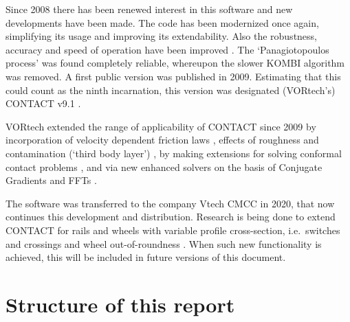\documentclass[12pt]{report}
\begin{document}
Since 2008 there has been renewed interest in this software and new
developments have been made. The code has been modernized once again,
simplifying its usage and improving its extendability. Also the robustness,
accuracy and speed of operation have been improved
\cite{Vollebregt2009a-cm2009}. The `Panagiotopoulos process' was found
completely reliable, whereupon the slower KOMBI algorithm was removed. A
first public version was published in 2009. Estimating that this could count
as the ninth incarnation, this version was designated (VORtech's) CONTACT
v9.1 \cite{Vollebregt2009b-userguide-v9}.

VORtech extended the range of applicability of CONTACT since 2009 by
incorporation of velocity dependent friction laws
\cite{Vollebregt2014c-tractcurv,Vollebregt2012a-quasistd}, effects of
roughness and contamination (`third body layer') 
\cite{Vollebregt2014c-tractcurv,Vollebregt2026a-tractcurv,
Vollebregt2021a-soa-paper,Vollebregt2024a-vor-fra}, by making extensions
for solving conformal contact problems \cite{Vollebregt2018b-corrigendum,
Vollebregt2020c-distr-force,Vollebregt2014d-conformal}, and via new
enhanced solvers on the basis of Conjugate Gradients and FFTs 
\cite{Vollebregt2014a-fftprec,Zhao_Jing2015a-tangcg}. 

The software was transferred to the company Vtech CMCC in 2020, that now
continues this development and distribution. Research is being done to
extend CONTACT for rails and wheels with variable profile cross-section,
i.e.\ switches and crossings \cite{Vollebregt2023a-iavsd2023} and wheel
out-of-roundness \cite{Vollebregt2024b-railways,
Vollebregt2024c-contact-geom}. When such new functionality is achieved,
this will be included in future versions of this document.

\section{Structure of this report}
\end{document}
